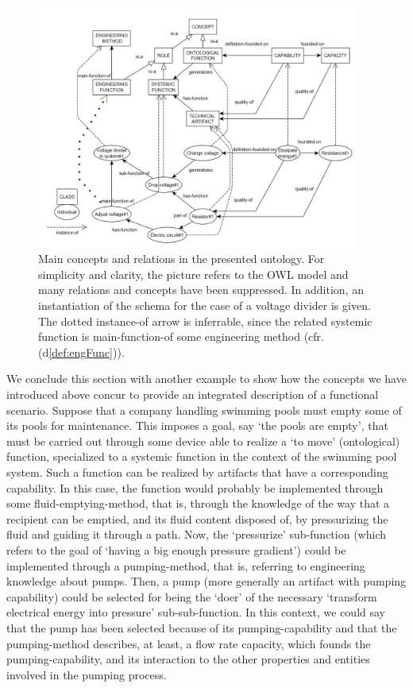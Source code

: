 \documentclass[sw]{iosart2x}
\newcommand{\DefLabel}{\textrm{d}}
\newcommand{\refdf}[1]{({\DefLabel}\ref{#1})}
\begin{document}
\begin{figure}
    \centering
    \includegraphics[width=0.95\textwidth]{schema-manual-nocolorv2.JPG}
    \caption{Main concepts and relations in the presented ontology. For simplicity and clarity, the picture refers to the OWL model and many relations and concepts have been suppressed. In addition, an instantiation of the schema for the case of a voltage divider is given. The dotted instance-of arrow is inferrable, since the related systemic function is main-function-of some engineering method (cfr. \refdf{def:engFunc}).}
    \label{fig:model}
\end{figure}

\medskip
We conclude this section with another example to show how the concepts we have introduced above concur to provide an integrated description of a functional scenario. Suppose that a company handling swimming pools must empty some of its pools for maintenance. This imposes a goal, say `the pools are empty', that must be carried out through some device able to realize a `to move' (ontological) function, specialized to a systemic function in the context of the swimming pool system.
Such a function can be realized by artifacts that have a corresponding capability. In this case, the function would probably be implemented through some fluid-emptying-method, that is, through the knowledge of the way that a recipient can be emptied, and its fluid content disposed of, by pressurizing the fluid and guiding it through a path.
Now, the `pressurize' sub-function (which refers to the goal of `having a big enough pressure gradient') could be implemented through a pumping-method, that is, referring to engineering knowledge about pumps.
Then, a pump (more generally an artifact with pumping capability) could be selected for being the `doer' of the necessary `transform electrical energy into pressure' sub-sub-function.
In this context, we could say that the pump has been selected because of its pumping-capability and that the pumping-method describes, at least, a flow rate capacity, which founds the pumping-capability, and its interaction to the other properties and entities involved in the pumping process. 
\end{document}
